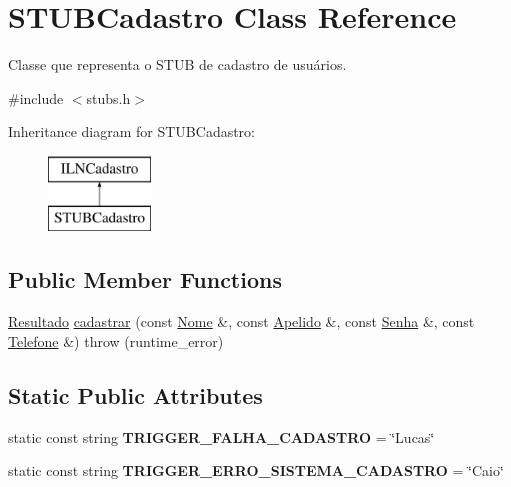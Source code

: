 \hypertarget{classSTUBCadastro}{}\section{S\+T\+U\+B\+Cadastro Class Reference}
\label{classSTUBCadastro}


Classe que representa o S\+T\+UB de cadastro de usuários.  




{\ttfamily \#include $<$stubs.\+h$>$}

Inheritance diagram for S\+T\+U\+B\+Cadastro\+:\begin{figure}[H]
\begin{center}
\leavevmode
\includegraphics[height=2.000000cm]{classSTUBCadastro}
\end{center}
\end{figure}
\subsection*{Public Member Functions}
\begin{DoxyCompactItemize}
\item 
\hyperlink{classResultado}{Resultado} \hyperlink{classSTUBCadastro_ad9c280c37447e41f6d6cc77adacf83a6}{cadastrar} (const \hyperlink{classNome}{Nome} \&, const \hyperlink{classApelido}{Apelido} \&, const \hyperlink{classSenha}{Senha} \&, const \hyperlink{classTelefone}{Telefone} \&)  throw (runtime\+\_\+error)
\end{DoxyCompactItemize}
\subsection*{Static Public Attributes}
\begin{DoxyCompactItemize}
\item 
\mbox{\label{classSTUBCadastro_a4cb2c182b8e8637adff931bd593dfca3}} 
static const string {\bfseries T\+R\+I\+G\+G\+E\+R\+\_\+\+F\+A\+L\+H\+A\+\_\+\+C\+A\+D\+A\+S\+T\+RO} = \char`\"{}Lucas\char`\"{}
\item 
\mbox{\label{classSTUBCadastro_aced27b1215db103532d8ec4418e57ffb}} 
static const string {\bfseries T\+R\+I\+G\+G\+E\+R\+\_\+\+E\+R\+R\+O\+\_\+\+S\+I\+S\+T\+E\+M\+A\+\_\+\+C\+A\+D\+A\+S\+T\+RO} = \char`\"{}Caio\char`\"{}
\end{DoxyCompactItemize}


